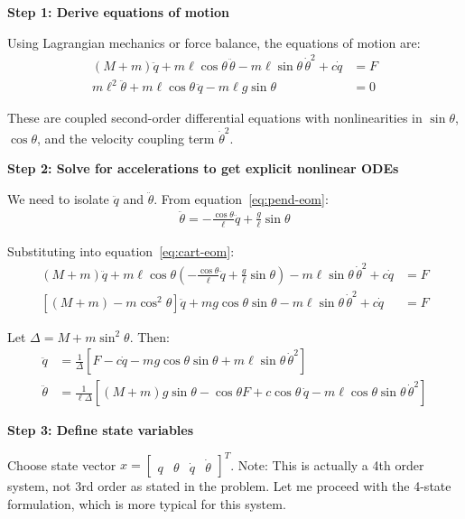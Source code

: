 \documentclass[11pt,a4paper]{article}
\begin{document}
\textbf{Step 1: Derive equations of motion}

Using Lagrangian mechanics or force balance, the equations of motion are:
\begin{align}
  (M + m)\ddot{q} + m\ell\cos\theta\,\ddot{\theta} - m\ell\sin\theta\,\dot{\theta}^2 + c\dot{q} &= F \label{eq:cart-eom}\\
  m\ell^2\ddot{\theta} + m\ell\cos\theta\,\ddot{q} - m\ell g\sin\theta &= 0 \label{eq:pend-eom}
\end{align}

These are coupled second-order differential equations with nonlinearities in $\sin\theta$, $\cos\theta$, and the velocity coupling term $\dot{\theta}^2$.

\textbf{Step 2: Solve for accelerations to get explicit nonlinear ODEs}

We need to isolate $\ddot{q}$ and $\ddot{\theta}$. From equation~\eqref{eq:pend-eom}:
\begin{align}
  \ddot{\theta} = -\frac{\cos\theta}{\ell}\ddot{q} + \frac{g}{\ell}\sin\theta
\end{align}

Substituting into equation~\eqref{eq:cart-eom}:
\begin{align}
  (M + m)\ddot{q} + m\ell\cos\theta\left(-\frac{\cos\theta}{\ell}\ddot{q} + \frac{g}{\ell}\sin\theta\right) - m\ell\sin\theta\,\dot{\theta}^2 + c\dot{q} &= F\\
  \left[(M + m) - m\cos^2\theta\right]\ddot{q} + mg\cos\theta\sin\theta - m\ell\sin\theta\,\dot{\theta}^2 + c\dot{q} &= F
\end{align}

Let $\Delta = M + m\sin^2\theta$. Then:
\begin{align}
  \ddot{q} &= \frac{1}{\Delta}\left[F - c\dot{q} - mg\cos\theta\sin\theta + m\ell\sin\theta\,\dot{\theta}^2\right]\\
  \ddot{\theta} &= \frac{1}{\ell\Delta}\left[(M+m)g\sin\theta - \cos\theta F + c\cos\theta\,\dot{q} - m\ell\cos\theta\sin\theta\,\dot{\theta}^2\right]
\end{align}

\textbf{Step 3: Define state variables}

Choose state vector $x = \begin{bmatrix} q & \theta & \dot{q} & \dot{\theta} \end{bmatrix}^T$. Note: This is actually a 4th order system, not 3rd order as stated in the problem. Let me proceed with the 4-state formulation, which is more typical for this system.
\end{document}
